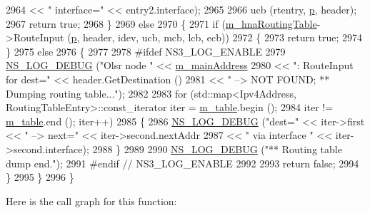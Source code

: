 \begin{DoxyCode}
2964                                  << \textcolor{stringliteral}{" interface="} << entry2.interface);
2965 
2966       ucb (rtentry, \hyperlink{lte__link__budget_8m_ac9de518908a968428863f829398a4e62}{p}, header);
2967       \textcolor{keywordflow}{return} \textcolor{keyword}{true};
2968     \}
2969   \textcolor{keywordflow}{else}
2970     \{
2971       \textcolor{keywordflow}{if} (\hyperlink{classns3_1_1olsr_1_1RoutingProtocol_a398799911ae136e0b247b4bbd608c336}{m\_hnaRoutingTable}->RouteInput (\hyperlink{lte__link__budget_8m_ac9de518908a968428863f829398a4e62}{p}, header, idev, ucb, mcb, lcb, ecb))
2972         \{
2973           \textcolor{keywordflow}{return} \textcolor{keyword}{true};
2974         \}
2975       \textcolor{keywordflow}{else}
2976         \{
2977 
2978 \textcolor{preprocessor}{#ifdef NS3\_LOG\_ENABLE}
2979           \hyperlink{group__logging_ga413f1886406d49f59a6a0a89b77b4d0a}{NS\_LOG\_DEBUG} (\textcolor{stringliteral}{"Olsr node "} << \hyperlink{classns3_1_1olsr_1_1RoutingProtocol_a58cc50ed5d1039aab603e90e318aabfb}{m\_mainAddress}
2980                                      << \textcolor{stringliteral}{": RouteInput for dest="} << header.GetDestination ()
2981                                      << \textcolor{stringliteral}{" --> NOT FOUND; ** Dumping routing table..."});
2982 
2983           \textcolor{keywordflow}{for} (std::map<Ipv4Address, RoutingTableEntry>::const\_iterator iter = 
      \hyperlink{classns3_1_1olsr_1_1RoutingProtocol_a9703fb92cc9a864c0e2874387ead3aa3}{m\_table}.begin ();
2984                iter != \hyperlink{classns3_1_1olsr_1_1RoutingProtocol_a9703fb92cc9a864c0e2874387ead3aa3}{m\_table}.end (); iter++)
2985             \{
2986               \hyperlink{group__logging_ga413f1886406d49f59a6a0a89b77b4d0a}{NS\_LOG\_DEBUG} (\textcolor{stringliteral}{"dest="} << iter->first << \textcolor{stringliteral}{" --> next="} << iter->second.nextAddr
2987                                     << \textcolor{stringliteral}{" via interface "} << iter->second.interface);
2988             \}
2989 
2990           \hyperlink{group__logging_ga413f1886406d49f59a6a0a89b77b4d0a}{NS\_LOG\_DEBUG} (\textcolor{stringliteral}{"** Routing table dump end."});
2991 \textcolor{preprocessor}{#endif // NS3\_LOG\_ENABLE}
2992 
2993           \textcolor{keywordflow}{return} \textcolor{keyword}{false};
2994         \}
2995     \}
2996 \}
\end{DoxyCode}


Here is the call graph for this function\+:



